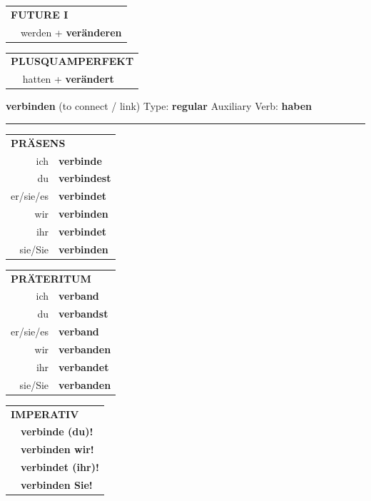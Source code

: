 \documentclass[10pt,a4paper]{revtex4-2}
\begin{document}
\begin{verbbox-acc}
\begin{tabular}{rl}
    \multicolumn{2}{l}{\textbf{FUTURE I} }\\
  &  werden + \textbf{veränderen}\\
 
  \end{tabular}
\hfill
   \begin{tabular}{rl}
      \multicolumn{2}{l}{\textbf{PLUSQUAMPERFEKT}}\\
   & hatten + \textbf{verändert}\\
  \end{tabular}
  
  \vspace{-5pt}


\end{verbbox-acc}

\begin{verbbox}
{\Large \bf verbinden} (to connect / link) \hfill Type: \textbf{regular} \hfill Auxiliary Verb: \textbf{haben}

\vspace{5pt}
\hrule
\vspace{5pt}

\begin{tabular}{rl}
\multicolumn{2}{l}{\textbf{PRÄSENS}}\\
ich & \textbf{verbinde}\\
du & \textbf{verbindest}\\
er/sie/es & \textbf{verbindet}\\
wir & \textbf{verbinden}\\
ihr & \textbf{verbindet}\\
sie/Sie & \textbf{verbinden}\\
\end{tabular}
\hfill
\begin{tabular}{rl}
\multicolumn{2}{l}{\textbf{PRÄTERITUM}}\\
ich & \textbf{verband}\\
du & \textbf{verbandst}\\
er/sie/es & \textbf{verband}\\
wir & \textbf{verbanden}\\
ihr & \textbf{verbandet}\\
sie/Sie & \textbf{verbanden}\\
\end{tabular}
\hfill
\begin{tabular}{rl}
\multicolumn{2}{l}{\textbf{IMPERATIV}}\\
& \textbf{verbinde (du)!}\\
& \textbf{verbinden wir!}\\
& \textbf{verbindet (ihr)!}\\
& \textbf{verbinden Sie!}\\
\end{tabular}


\end{verbbox}
\end{document}
